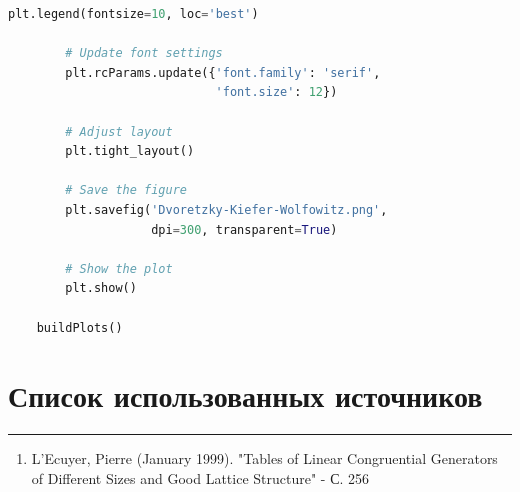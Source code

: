 \documentclass[a4paper, 14pt]{extarticle}
\begin{document}
\begin{center}
\begin{lstlisting}[language=Python]
        plt.legend(fontsize=10, loc='best')

        # Update font settings
        plt.rcParams.update({'font.family': 'serif', 
                             'font.size': 12})

        # Adjust layout
        plt.tight_layout()

        # Save the figure
        plt.savefig('Dvoretzky-Kiefer-Wolfowitz.png', 
                    dpi=300, transparent=True)

        # Show the plot
        plt.show()

    buildPlots()
  \end{lstlisting}
\end{center}


\newpage
\section{Список использованных источников}\vspace{-20pt}\rule{\linewidth}{0.1mm}
\begin{enumerate}
  \item \label{item:source1} L'Ecuyer, Pierre (January 1999). "Tables of Linear Congruential Generators of Different Sizes and Good Lattice Structure" - С. 256
\end{enumerate}
\end{document}
